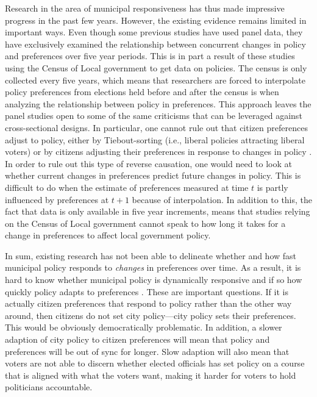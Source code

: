 \documentclass[a4paper,12pt]{article}
\begin{document}
 
 Research in the area of municipal responsiveness has thus made impressive progress in the past few years. However, the existing evidence remains limited in important ways. Even though some previous studies have used panel data, they have exclusively examined  the relationship between concurrent changes in policy and preferences over five year periods. 
 This is in part a result of these studies using the Census of Local government to get data on policies. The census is only collected every five years, which means that researchers are forced to interpolate policy preferences from elections held before and after the census is when analyzing the relationship between policy in preferences. This approach leaves the panel studies open to some of the same criticisms that can be leveraged against cross-sectional designs. In particular, one cannot rule out that citizen preferences adjust to policy, either by Tiebout-sorting (i.e., liberal policies attracting liberal voters) or by citizens adjusting their preferences in response to changes in policy \citep[e.g.,]{tiebout1956pure,broockman2017causal}. In order to rule out this type of reverse causation, one would need to look at whether current changes in preferences predict future changes in policy. This is difficult to do when the estimate of preferences measured at time $t$ is partly influenced by preferences at $t+1$ because of interpolation. In addition to this, the fact that data is only available in five year increments, means that studies relying on the Census of Local government cannot speak to how long it takes for a change in preferences to affect local government policy. 
 

 
 In sum, existing research has not been able to delineate whether and how fast municipal policy responds to \textit{changes} in preferences over time. As a result, it is hard to know whether municipal policy is dynamically responsive and if so how quickly policy adapts to preferences \citep[cf.][]{stimson1995dynamic}. These are important questions. If it is actually citizen preferences that respond to policy rather than the other way around, then citizens do not set city policy---city policy sets their preferences. This would be obviously democratically problematic. In addition, a slower adaption of city policy to citizen preferences will mean that policy and preferences will be out of sync for longer. Slow adaption will also mean that voters are not able to discern whether elected officials has set policy on a course that is aligned with what the voters want, making it harder for voters to hold politicians accountable.
  
\end{document}
